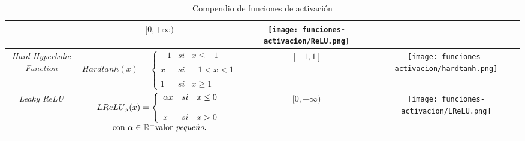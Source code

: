 \begin{table}[H]
{\begin{tabular}{| c | c | c | c |}
        & %
        $[0,+\infty)$
        & %
        \begin{minipage}{\coeficienteAncho\textwidth}
            \texttt{[image: funciones-activacion/ReLU.png]}
        \end{minipage}
        \\
        \hline
        \textit{Hard Hyperbolic Function}
        & %
        $Hardtanh(x) =\left\{ \begin{array}{lcc}
            -1 &   si  & x \leq -1 \\
            \\ x &  si & -1< x < 1 \\
            \\ 1&  si  & x \geq 1 
            \end{array}
        \right.$
        & %
        $[-1,1]$
        & %
        \begin{minipage}{\coeficienteAncho\textwidth}
            \texttt{[image: funciones-activacion/hardtanh.png]}
        \end{minipage}
        \\
        \hline
        \textit{Leaky ReLU}
        & %
        $\begin{array}{c}

            LReLU_{\alpha}(x) =\left\{ \begin{array}{lcc}
            \alpha x &   si  & x \leq 0 \\
            \\ x&  si  & x > 0 
            \end{array}
            \right.
        \\
        \text{con } \alpha \in \R^+ \text{valor }\textit{pequeño}.
        \end{array}
        $
        & %
        $[0, +\infty)$
        & %
        \begin{minipage}{\coeficienteAncho\textwidth}
            \texttt{[image: funciones-activacion/LReLU.png]}
        \end{minipage}
        \\
        \hline
    \end{tabular}
    } %
    \caption{Compendio de funciones de activación}  
    \label{table:funciones-de-activation}
\end{table}

